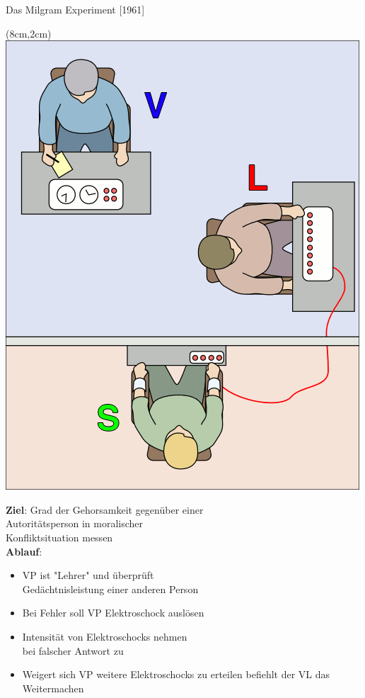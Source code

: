 \documentclass[10pt]{beamer}
\begin{document}
	\begin{frame}{Das Milgram Experiment [1961]}
		\begin{textblock*}{5cm}(8cm,2cm) %
			\includegraphics[scale=0.2]{./pics/Milgram_Experiment.png}
		\end{textblock*}
		
		\textbf{Ziel}: Grad der Gehorsamkeit gegenüber einer \\Autoritätsperson in moralischer \\Konfliktsituation messen\\
		
		\textbf{Ablauf}:
		\begin{itemize}
			\item VP ist "Lehrer" und überprüft \\Gedächtnisleistung einer anderen Person
			\item Bei Fehler soll VP Elektroschock auslösen
			\item Intensität von Elektroschocks nehmen \\bei falscher Antwort zu
			\item Weigert sich VP weitere Elektroschocks zu erteilen befiehlt der VL das Weitermachen
		\end{itemize}
		
	\end{frame}
	
\end{document}
